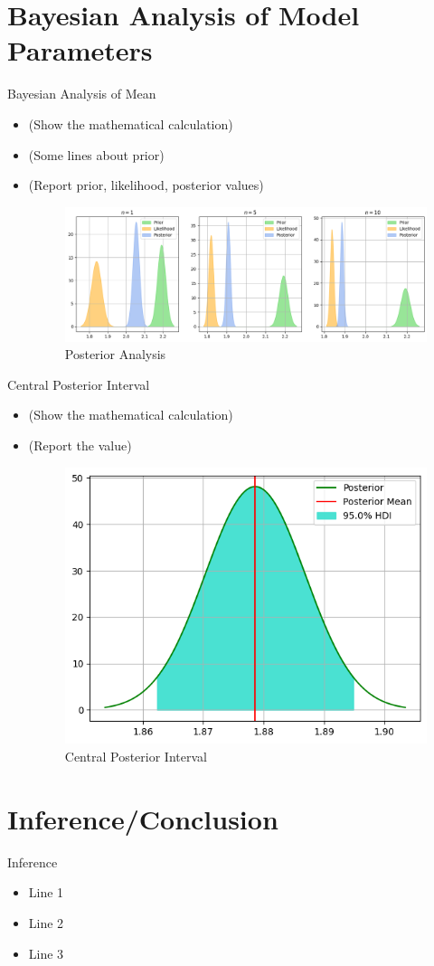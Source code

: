 \section{Bayesian Analysis of Model Parameters}

\begin{frame}{Bayesian Analysis of Mean}
\begin{itemize}
        \item (Show the mathematical calculation)
        \item (Some lines about prior)
        \item (Report prior, likelihood, posterior values)
        \begin{figure}
        \centering
        \includegraphics[width=0.5\linewidth]{Project1/Report/images/posterior.png}
        \caption{Posterior Analysis}
        \label{fig:enter-label}
    \end{figure}
\end{itemize}
  
\end{frame}

\begin{frame}{Central Posterior Interval}
\begin{itemize}
        \item (Show the mathematical calculation)
        \item (Report the value)
        \begin{figure}
        \centering
        \includegraphics[width=0.5\linewidth]{Project1/Report/images/hdi.png}
        \caption{Central Posterior Interval}
        \label{fig:enter-label}
    \end{figure}
\end{itemize}
  
\end{frame}

\section{Inference/Conclusion}

\begin{frame}{Inference}
\begin{itemize}
        \item Line 1
        \item Line 2
        \item Line 3
\end{itemize}
  
\end{frame}
